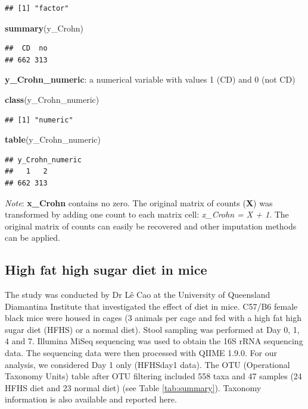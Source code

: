 \documentclass[openany]{book}
\newenvironment{Shaded}{\begin{snugshade}}{\end{snugshade}}
\newcommand{\KeywordTok}[1]{\textcolor[rgb]{0.13,0.29,0.53}{\textbf{#1}}}
\newcommand{\NormalTok}[1]{#1}
\begin{document}
\begin{verbatim}
## [1] "factor"
\end{verbatim}

\begin{Shaded}
\begin{Highlighting}[]
\KeywordTok{summary}\NormalTok{(y_Crohn)}
\end{Highlighting}
\end{Shaded}

\begin{verbatim}
##  CD  no 
## 662 313
\end{verbatim}

\textbf{y\_Crohn\_numeric}: a numerical variable with values 1 (CD) and
0 (not CD)

\begin{Shaded}
\begin{Highlighting}[]
\KeywordTok{class}\NormalTok{(y_Crohn_numeric)}
\end{Highlighting}
\end{Shaded}

\begin{verbatim}
## [1] "numeric"
\end{verbatim}

\begin{Shaded}
\begin{Highlighting}[]
\KeywordTok{table}\NormalTok{(y_Crohn_numeric)}
\end{Highlighting}
\end{Shaded}

\begin{verbatim}
## y_Crohn_numeric
##   1   2 
## 662 313
\end{verbatim}

\emph{Note}: \textbf{x\_Crohn} contains no zero. The original matrix of
counts (\textbf{X}) was transformed by adding one count to each matrix
cell: \emph{x\_Crohn = X + 1}. The original matrix of counts can easily
be recovered and other imputation methods can be applied.

\subsection{High fat high sugar diet in
mice}\label{high-fat-high-sugar-diet-in-mice}

The study was conducted by Dr Lê Cao at the University of Queensland
Diamantina Institute that investigated the effect of diet in mice.
C57/B6 female black mice were housed in cages (3 animals per cage and
fed with a high fat high sugar diet (HFHS) or a normal diet). Stool
sampling was performed at Day 0, 1, 4 and 7. Illumina MiSeq sequencing
was used to obtain the 16S rRNA sequencing data. The sequencing data
were then processed with QIIME 1.9.0. For our analysis, we considered
Day 1 only (HFHSday1 data). The OTU (Operational Taxonomy Units) table
after OTU filtering included 558 taxa and 47 samples (24 HFHS diet and
23 normal diet) (see Table \ref{tab:summary}). Taxonomy information is
also available and reported here.
\end{document}
